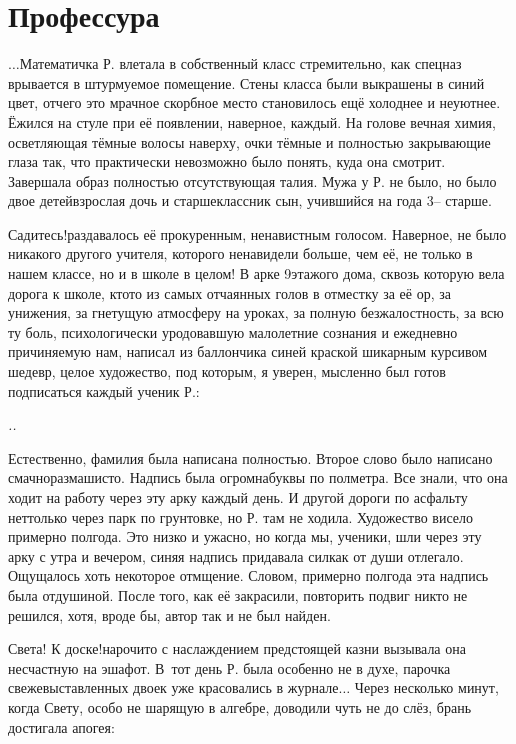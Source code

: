 \newpage
\section*{Профессура}

$\ldots$Математичка Р. влетала в собственный класс стремительно, как спецназ врывается в штурмуемое помещение. Стены класса были выкрашены в синий цвет, отчего это мрачное скорбное место становилось ещё холоднее и неуютнее. Ёжился на стуле при её появлении, наверное, каждый. На голове вечная химия, осветляющая тёмные волосы наверху, очки тёмные и полностью закрывающие глаза так, что практически невозможно было понять, куда она смотрит. Завершала образ полностью отсутствующая талия. Мужа у Р. не было, но было двое детей\mdash взрослая дочь и старшеклассник сын, учившийся на года 3\thinspace\nobreakdash-- старше.

\diagdash Садитесь!\mdash раздавалось её прокуренным, ненавистным голосом. Наверное, не было никакого другого учителя, которого ненавидели больше, чем её, не только в нашем классе, но и в школе в целом! В арке 9\sdash этажого дома, сквозь которую вела дорога к школе, кто\sdash то из самых отчаянных голов в отместку за её ор, за унижения, за гнетущую атмосферу на уроках, за полную безжалостность, за всю ту боль, психологически уродовавшую малолетние сознания и ежедневно причиняемую нам, написал из баллончика синей краской шикарным курсивом шедевр, целое художество, под которым, я уверен, мысленно был готов подписаться каждый ученик Р.:
\begin{center}
\LARGE\textit{{.}\mdash {}.} 
\end{center}

Естественно, фамилия была написана полностью. Второе слово было написано смачно\sdash размашисто. Надпись была огромна\mdash буквы по полметра. Все знали, что она ходит на работу через эту арку каждый день. И другой дороги по асфальту нет\mdash только через парк по грунтовке, но Р. там не ходила. Художество висело примерно полгода. Это низко и ужасно, но когда мы, ученики, шли через эту арку с утра и вечером, синяя надпись придавала сил\mdash как от души отлегало. Ощущалось хоть некоторое отмщение. Словом, примерно полгода эта надпись была отдушиной. После того, как её закрасили, повторить подвиг никто не решился, хотя, вроде бы, автор так и не был найден.

\diagdash Света! К доске!\mdash нарочито с наслаждением предстоящей казни вызывала она несчастную на эшафот. В~тот день Р. была особенно не в духе, парочка свежевыставленных двоек уже красовались в журнале$\ldots$ Через несколько минут, когда Свету, особо не шарящую в алгебре, доводили чуть не до слёз, брань достигала апогея:

